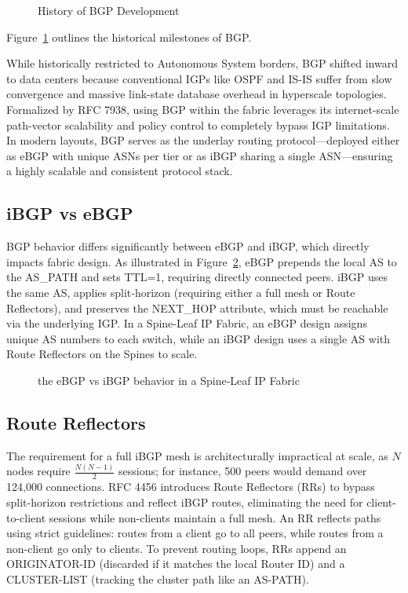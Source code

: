 \begin{figure}[!htbp]
\centering
\BGPhistory
\caption{History of BGP Development}
\label{fig:bgp-history}
\end{figure}
Figure~\ref{fig:bgp-history} outlines the historical milestones of BGP.

While historically restricted to Autonomous System borders, BGP shifted inward to data centers because conventional IGPs like OSPF and IS-IS suffer from slow convergence and massive link-state database overhead in hyperscale topologies. Formalized by RFC 7938, using BGP within the fabric leverages its internet-scale path-vector scalability and policy control to completely bypass IGP limitations\cite{Cisco_IGP_Scalability_Limitations_DC_Fabrics,IETFRFC7938}. In modern layouts, BGP serves as the underlay routing protocol—deployed either as eBGP with unique ASNs per tier or as iBGP sharing a single ASN—ensuring a highly scalable and consistent protocol stack.

\subsection{iBGP vs eBGP}
BGP behavior differs significantly between eBGP and iBGP, which directly impacts fabric design. As illustrated in Figure~\ref{fig:eBGPvsiBGP}, eBGP prepends the local AS to the AS\_PATH and sets TTL=1, requiring directly connected peers. iBGP uses the same AS, applies split‑horizon (requiring either a full mesh or Route Reflectors), and preserves the NEXT\_HOP attribute, which must be reachable via the underlying IGP. In a Spine‑Leaf IP Fabric, an eBGP design assigns unique AS numbers to each switch, while an iBGP design uses a single AS with Route Reflectors on the Spines to scale.

\begin{figure}[!htbp]
    \centering
    \ebgpibgp
    \caption{ the eBGP vs iBGP behavior in a Spine‑Leaf IP Fabric}
    \label{fig:eBGPvsiBGP}
\end{figure}

\subsection*{Route Reflectors}
The requirement for a full iBGP mesh is architecturally impractical at scale, as $N$ nodes require $\frac{N(N-1)}{2}$ sessions; for instance, 500 peers would demand over 124,000 connections. RFC 4456 introduces Route Reflectors (RRs) to bypass split-horizon restrictions and reflect iBGP routes, eliminating the need for client-to-client sessions while non-clients maintain a full mesh\cite{IETFRFC4456}. An RR reflects paths using strict guidelines: routes from a client go to all peers, while routes from a non-client go only to clients. To prevent routing loops, RRs append an ORIGINATOR-ID (discarded if it matches the local Router ID) and a CLUSTER-LIST (tracking the cluster path like an AS-PATH)\cite{IETFRFC4456}.
